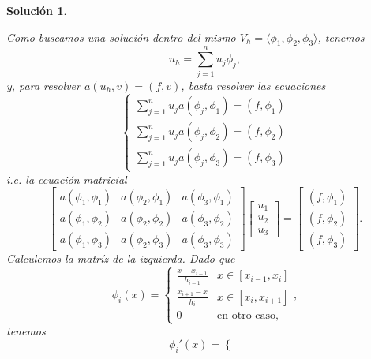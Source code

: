 \documentclass[11pt]{article}
\newtheorem*{sol}{Solución}
\newcommand\<{\langle}
\renewcommand\>{\rangle}
\begin{document}
\begin{sol}
\begin{center}
  \end{center}
  Como buscamos una solución dentro del mismo
  $V_h=\<\phi_1,\phi_2,\phi_3\>$, tenemos
  \begin{equation}
    u_h = \sum_{j=1}^{n}u_j\phi_j
  ,\end{equation}
  y, para resolver $a(u_h,v)=(f,v)$, basta resolver las ecuaciones
  \begin{equation}
    \left\{
      \begin{aligned}
        \sum_{j=1}^{n}u_j a(\phi_j,\phi_1) = (f,\phi_1)
        \\
        \sum_{j=1}^{n}u_j a(\phi_j,\phi_2) = (f,\phi_2)
        \\
        \sum_{j=1}^{n}u_j a(\phi_j,\phi_3) = (f,\phi_3)
      \end{aligned}
    \right.
  \end{equation}
  i.e. la ecuación matricial
  \begin{equation}
    \begin{bmatrix}
      a(\phi_1,\phi_1)
      &a(\phi_2,\phi_1)
      &a(\phi_3,\phi_1)
      \\
      a(\phi_1,\phi_2)
      &a(\phi_2,\phi_2)
      &a(\phi_3,\phi_2)
      \\
      a(\phi_1,\phi_3)
      &a(\phi_2,\phi_3)
      &a(\phi_3,\phi_3)
    \end{bmatrix}
    \begin{bmatrix}
      u_1 \\ u_2 \\ u_3
    \end{bmatrix}
    =
    \begin{bmatrix}
      (f,\phi_1) \\ (f,\phi_2) \\ (f,\phi_3)
    \end{bmatrix}.
  \end{equation}
  Calculemos la matríz de la izquierda. Dado que
  \begin{equation}
    \phi_i(x)
    =
    \begin{cases}
      \frac{x-x_{i-1}}{h_{i-1}} & x\in[x_{i-1},x_i] \\
      \frac{x_{i+1}-x}{h_i} & x\in[x_i,x_{i+1}] \\
      0 & \text{en otro caso},
    \end{cases}
  ,\end{equation}
  tenemos
  \begin{equation}
    \phi_i'(x)
    =
    \begin{cases}

\end{cases}
\end{equation}
\end{sol}
\end{document}
